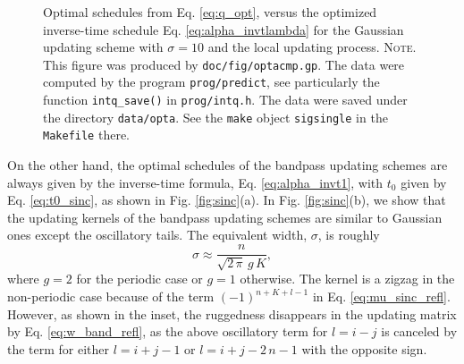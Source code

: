 \documentclass[reprint, floatfix]{revtex4-1}
\newcommand{\note}[1]{{\color{DarkGreen}\footnotesize \textsc{Note.} #1}}
\begin{document}
\begin{figure}[h]
\begin{center}
  \caption{
    \label{fig:optacmp}
    Optimal schedules from Eq. \eqref{eq:q_opt},
    versus the optimized inverse-time schedule
    Eq. \eqref{eq:alpha_invtlambda}
    for the Gaussian updating scheme
    with $\sigma = 10$
    and the local updating process.
    \note{This figure was produced by \texttt{doc/fig/optacmp.gp}.
      The data were computed by the program \texttt{prog/predict},
      see particularly the function \texttt{intq\_save()}
      in \texttt{prog/intq.h}.
      The data were saved under the directory \texttt{data/opta}.
      See the \texttt{make} object \texttt{sigsingle}
      in the \texttt{Makefile} there.
    }%
  }
\end{center}
\end{figure}




On the other hand,
the optimal schedules of the bandpass updating schemes
are always given by the inverse-time formula,
Eq. \eqref{eq:alpha_invt1},
with $t_0$ given by Eq. \eqref{eq:t0_sinc},
as shown in Fig. \ref{fig:sinc}(a).
%
In Fig. \ref{fig:sinc}(b),
we show that the updating kernels
of the bandpass updating schemes
are similar to Gaussian ones
except the oscillatory tails.
%
The equivalent width, $\sigma$, is roughly
%
\begin{equation}
  \sigma
  \approx
  \frac
  {
    n
  }
  {
    \sqrt{ 2 \, \pi } \, g \, K
  }
  ,
\label{eq:sigma_equiv}
\end{equation}
%
where $g = 2$ for the periodic case
or $g = 1$ otherwise.
%
The kernel is a zigzag in the non-periodic case
because of the term $(-1)^{n+K+l-1}$
in Eq. \eqref{eq:mu_sinc_refl}.
%
However, as shown in the inset, %
the ruggedness disappears
in the updating matrix by Eq. \eqref{eq:w_band_refl},
as the above oscillatory term for $l = i - j$
is canceled by the term for either $l = i + j - 1$
or $l = i + j - 2 \, n - 1$
with the opposite sign.
\end{document}
